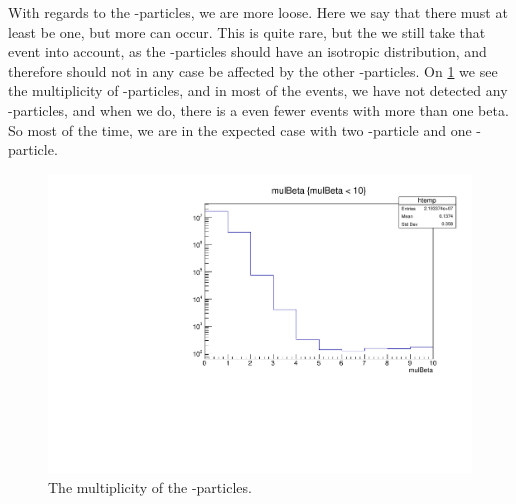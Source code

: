 With regards to the \be-particles, we are more loose. Here we say that there must at least be one, but more can occur. This is quite rare, but the we still take that event into account, as the \be-particles should have an isotropic distribution, and therefore should not in any case be affected by the other \al-particles. On \cref{fig:mulBeta} we see the multiplicity of \be-particles, and in most of the events, we have not detected any \be-particles, and when we do, there is a even fewer events with more than one beta. So most of the time, we are in the expected case with two \al-particle and one \be-particle. 

\begin{figure}[h]
	\includegraphics[width=\linewidth]{../figures/mulBeta.pdf}
	\caption{The multiplicity of the \be-particles.}
	\label{fig:mulBeta}
\end{figure}